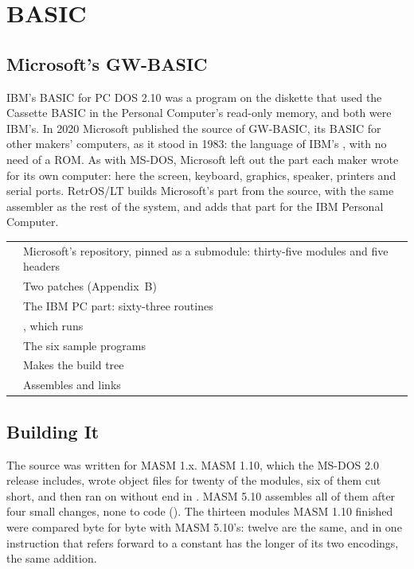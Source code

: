 \mwnewpart
\renewcommand\runningtitle{Section 8. BASIC}
\chapter{BASIC}
\sectioncontents

\section{Microsoft's GW-BASIC}

\begin{plainwords}
IBM's BASIC for PC DOS 2.10 was a program on the diskette that used the
Cassette BASIC in the Personal Computer's read-only memory, and both were
IBM's. In 2020 Microsoft published the source of GW-BASIC, its BASIC for
other makers' computers, as it stood in 1983: the language of IBM's
, with no need of a ROM. As with MS-DOS, Microsoft left out
the part each maker wrote for its own computer: here the screen,
keyboard, graphics, speaker, printers and serial ports. RetrOS/LT builds
Microsoft's part from the source, with the same assembler as the rest of
the system, and adds that part for the IBM Personal Computer.
\end{plainwords}

\begin{tabularx}{\textwidth}{@{}P{2.0in}Y@{}}
\toprule
{} & Microsoft's repository, pinned as a submodule:
thirty-five modules and five headers\\
 & Two patches (Appendix~B)\\
 & The IBM PC part: sixty-three routines\\
 & , which runs \\
 & The six sample programs\\
 & Makes the build tree\\
 & Assembles and links\\
\bottomrule
\end{tabularx}

\section{Building It}

The source was written for MASM 1.x. MASM 1.10, which the MS-DOS 2.0
release includes, wrote object files for twenty of the modules, six of
them cut short, and then ran on without end in . MASM
5.10 assembles all of them after four small changes, none to code
(). The thirteen modules MASM 1.10 finished were compared
byte for byte with MASM 5.10's: twelve are the same, and in
 one instruction that refers forward to a constant has
the longer of its two encodings, the same addition.


